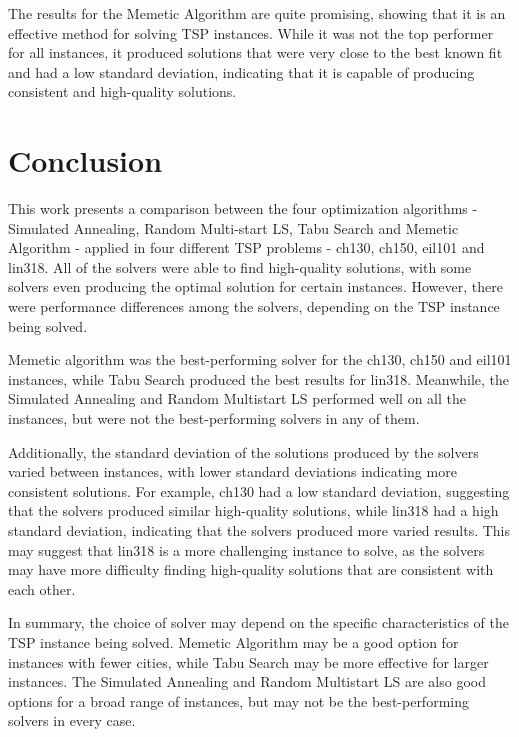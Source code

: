 \documentclass[conference]{IEEEtran}
\begin{document}
    The results for the Memetic Algorithm are quite promising, showing that it is an effective method for solving TSP instances. While it was not the top performer for all instances, it produced solutions that were very close to the best known fit and had a low standard deviation, indicating that it is capable of producing consistent and high-quality solutions.


    \section{Conclusion}
    This work presents a comparison between the four optimization algorithms - Simulated Annealing, Random Multi-start LS, Tabu Search and Memetic Algorithm - applied in four different TSP problems - ch130, ch150, eil101 and lin318. All of the solvers were able to find high-quality solutions, with some solvers even producing the optimal solution for certain instances. However, there were performance differences among the solvers, depending on the TSP instance being solved.

    Memetic algorithm was the best-performing solver for the ch130, ch150 and eil101 instances, while Tabu Search produced the best results for lin318. Meanwhile, the Simulated Annealing and Random Multistart LS performed well on all the instances, but were not the best-performing solvers in any of them.

    Additionally, the standard deviation of the solutions produced by the solvers varied between instances, with lower standard deviations indicating more consistent solutions. For example, ch130 had a low standard deviation, suggesting that the solvers produced similar high-quality solutions, while lin318 had a high standard deviation, indicating that the solvers produced more varied results. This may suggest that lin318 is a more challenging instance to solve, as the solvers may have more difficulty finding high-quality solutions that are consistent with each other.

    In summary, the choice of solver may depend on the specific characteristics of the TSP instance being solved. Memetic Algorithm may be a good option for instances with fewer cities, while Tabu Search may be more effective for larger instances. The Simulated Annealing and Random Multistart LS are also good options for a broad range of instances, but may not be the best-performing solvers in every case.
\end{document}
